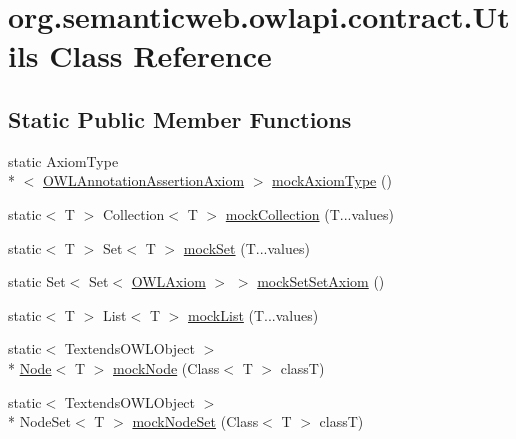 \hypertarget{classorg_1_1semanticweb_1_1owlapi_1_1contract_1_1_utils}{\section{org.\-semanticweb.\-owlapi.\-contract.\-Utils Class Reference}
\label{classorg_1_1semanticweb_1_1owlapi_1_1contract_1_1_utils}
}
\subsection*{Static Public Member Functions}
\begin{DoxyCompactItemize}
\item 
static Axiom\-Type\\*
$<$ \hyperlink{interfaceorg_1_1semanticweb_1_1owlapi_1_1model_1_1_o_w_l_annotation_assertion_axiom}{O\-W\-L\-Annotation\-Assertion\-Axiom} $>$ \hyperlink{classorg_1_1semanticweb_1_1owlapi_1_1contract_1_1_utils_a7a2b9aa89ea8cc57b7f415d49df63b46}{mock\-Axiom\-Type} ()
\item 
static$<$ T $>$ Collection$<$ T $>$ \hyperlink{classorg_1_1semanticweb_1_1owlapi_1_1contract_1_1_utils_a9d08937d2ebdcc7c118de7cb080f2022}{mock\-Collection} (T...\-values)
\item 
static$<$ T $>$ Set$<$ T $>$ \hyperlink{classorg_1_1semanticweb_1_1owlapi_1_1contract_1_1_utils_ac6f055b21cc2ac81fdd8f8830d3b698d}{mock\-Set} (T...\-values)
\item 
static Set$<$ Set$<$ \hyperlink{interfaceorg_1_1semanticweb_1_1owlapi_1_1model_1_1_o_w_l_axiom}{O\-W\-L\-Axiom} $>$ $>$ \hyperlink{classorg_1_1semanticweb_1_1owlapi_1_1contract_1_1_utils_ae7d6219d13d22285dc40976f02da0afa}{mock\-Set\-Set\-Axiom} ()
\item 
static$<$ T $>$ List$<$ T $>$ \hyperlink{classorg_1_1semanticweb_1_1owlapi_1_1contract_1_1_utils_ae3142e16feefdced50e89eaf69f3971e}{mock\-List} (T...\-values)
\item 
static$<$ Textends\-O\-W\-L\-Object $>$\\*
 \hyperlink{interfaceorg_1_1coode_1_1owlapi_1_1functionalparser_1_1_node}{Node}$<$ T $>$ \hyperlink{classorg_1_1semanticweb_1_1owlapi_1_1contract_1_1_utils_a635ff64c725b04ffd9467f3cb7cc7c8b}{mock\-Node} (Class$<$ T $>$ class\-T)
\item 
static$<$ Textends\-O\-W\-L\-Object $>$\\*
 Node\-Set$<$ T $>$ \hyperlink{classorg_1_1semanticweb_1_1owlapi_1_1contract_1_1_utils_a9f5187f09fa72036444c27846c23c319}{mock\-Node\-Set} (Class$<$ T $>$ class\-T)

\end{DoxyCompactItemize}

